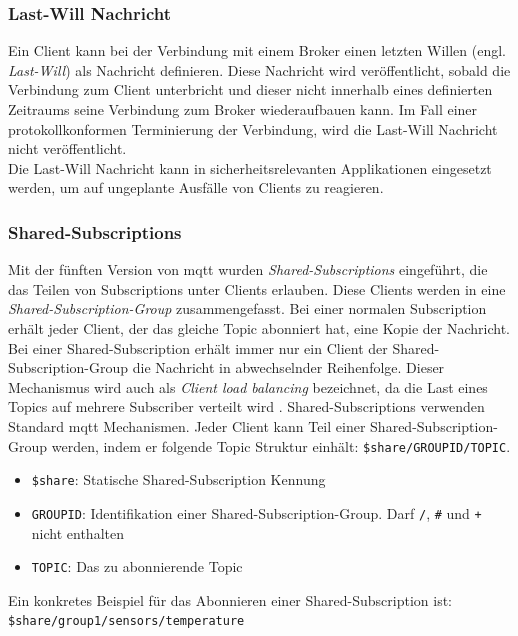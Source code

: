 \subsubsection{Last-Will Nachricht} \label{s:last-will}
Ein Client kann bei der Verbindung mit einem Broker einen letzten Willen (engl. \textit{Last-Will}) als Nachricht definieren. Diese Nachricht wird veröffentlicht, sobald die Verbindung zum Client unterbricht und dieser nicht innerhalb eines definierten Zeitraums seine Verbindung zum Broker wiederaufbauen kann.
Im Fall einer protokollkonformen Terminierung der Verbindung, wird die Last-Will Nachricht nicht veröffentlicht.
\cite{soniSURVEYMQTTPROTOCOL}\\
Die Last-Will Nachricht kann in sicherheitsrelevanten Applikationen eingesetzt werden, um auf ungeplante Ausfälle von Clients zu reagieren.

\subsubsection{Shared-Subscriptions} \label{s:shared-subscriptions}
Mit der fünften Version von \ac{mqtt} wurden \textit{Shared-Subscriptions} eingeführt, die das Teilen von Subscriptions unter Clients erlauben. Diese Clients werden in eine \textit{Shared-Subscription-Group} zusammengefasst. Bei einer normalen Subscription erhält jeder Client, der das gleiche Topic abonniert hat, eine Kopie der Nachricht. Bei einer Shared-Subscription erhält immer nur ein Client der Shared-Subscription-Group die Nachricht in abwechselnder Reihenfolge. Dieser Mechanismus wird auch als \textit{Client load balancing} bezeichnet, da die Last eines Topics auf mehrere Subscriber verteilt wird \cite{raschbichlerMQTTHowNew}.
Shared-Subscriptions verwenden Standard \ac{mqtt} Mechanismen. Jeder Client kann Teil einer Shared-Subscription-Group werden, indem er folgende Topic Struktur einhält: \verb|$share/GROUPID/TOPIC|.
\begin{itemize}
    \item \verb|$share|: Statische Shared-Subscription Kennung
    \item \verb|GROUPID|: Identifikation einer Shared-Subscription-Group. Darf \verb|/|, \verb|#| und \verb|+| nicht enthalten
    \item \verb|TOPIC|: Das zu abonnierende Topic
\end{itemize}
Ein konkretes Beispiel für das Abonnieren einer Shared-Subscription ist:
\newline
\verb|$share/group1/sensors/temperature|

